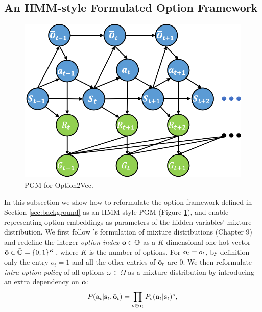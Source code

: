 \documentclass{article}
\begin{document}
\subsection{An HMM-style Formulated Option Framework}
\label{sec:option_pgm}
\vspace{-2mm}
\begin{figure}
  \vspace{-3mm}
  \includegraphics[width=1\linewidth]{./figures/doe.png}
  \caption{\label{fig:pgm}\small PGM for Option2Vec.}
  \vspace{-5mm}
\end{figure}
In this subsection we show how to reformulate the option framework
defined in Section \ref{sec:background} as an HMM-style PGM
(Figure \ref{fig:pgm}), and enable representing option embeddings
as parameters of the hidden variables' mixture distribution. We
first follow 's formulation of
mixture distributions (Chapter 9) and redefine the integer
\emph{option index} ${\mathbf{o}}\in{\mathbb{O}}$ as a $K$-dimensional one-hot
vector $\bar{{\mathbf{o}}}\in\bar{{\mathbb{O}}}=\{0,1\}^K$, where $K$ is the
number of options. For $\bar{{\mathbf{o}}}_t=o_t$, by definition only the
entry $o_t=1$ and all the other entries of $\bar{{\mathbf{o}}}_t$ are
$0$. We then reformulate \emph{intra-option policy} of all
options $\omega\in\Omega$ as a mixture distribution by
introducing an extra dependency on $\bar{{\mathbf{o}}}$:
\begin{align}
  \label{eq:mixture_option_triple}
  P({\mathbf{a}}_t|{\mathbf{s}}_t,\bar{{\mathbf{o}}}_t) =
  \prod_{o\in\bar{{\mathbf{o}}}_t}P_{o}({\mathbf{a}}_t|{\mathbf{s}}_t)^{o},\\[-1.5em]\nonumber
\end{align}
\end{document}
